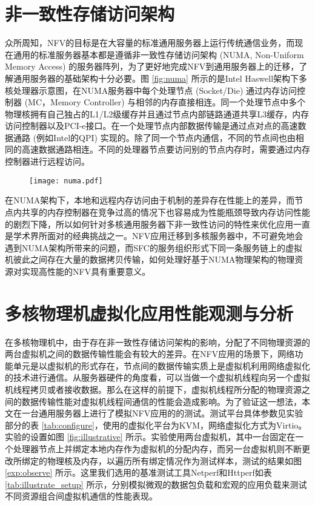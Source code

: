 \section{非一致性存储访问架构}
\label{sec:numa}
众所周知，NFV的目标是在大容量的标准通用服务器上运行传统通信业务，而现在通用的标准服务器基本都是遵循非一致性存储访问架构 (NUMA, Non-Uniform Memory Access) 的服务器阵列，为了更好地完成NFV到通用服务器上的迁移，了解通用服务器的基础架构十分必要。图 \ref{fig:numa} 所示的是Intel Haswell架构下多核处理器示意图，在NUMA服务器中每个处理节点 (Socket/Die) 通过内存访问控制器 (MC，Memory Controller) 与相邻的内存直接相连。同一个处理节点中多个物理核拥有自己独占的L1/L2级缓存并且通过节点内部链路通道共享L3缓存，内存访问控制器以及PCI-e接口。在一个处理节点内部数据传输是通过点对点的高速数据通路 (例如Intel的QPI) 实现的。除了同一个节点内通信，不同的节点间也由相同的高速数据通路相连。不同的处理器节点要访问别的节点内存时，需要通过内存控制器进行远程访问。
\begin{figure}[!htp]
	\centering
	\texttt{[image: numa.pdf]}
\end{figure}
在NUMA架构下，本地和远程内存访问由于机制的差异存在性能上的差异，而节点内共享的内存控制器在竞争过高的情况下也容易成为性能瓶颈导致内存访问性能的剧烈下降，所以如何针对多核通用服务器下非一致性访问的特性来优化应用一直是学术界所面对的经典挑战之一。NFV应用迁移到多核服务器中，不可避免地会遇到NUMA架构所带来的问题，而SFC的服务组织形式下同一条服务链上的虚拟机彼此之间存在大量的数据拷贝传输，如何处理好基于NUMA物理架构的物理资源对实现高性能的NFV具有重要意义。


\section{多核物理机虚拟化应用性能观测与分析}
\label{related:observe}
在多核物理机中，由于存在非一致性存储访问架构的影响，分配了不同物理资源的两台虚拟机之间的数据传输性能会有较大的差异。在NFV应用的场景下，网络功能单元是以虚拟机的形式存在，节点间的数据传输实质上是虚拟机利用网络虚拟化的技术进行通信。从服务器硬件的角度看，可以当做一个虚拟机线程向另一个虚拟机线程拷贝或者接收数据。那么在这样的前提下，虚拟机线程所分配的物理资源之间的数据传输性能对虚拟机线程间通信的性能会造成影响。为了验证这一想法，本文在一台通用服务器上进行了模拟NFV应用的的测试。测试平台具体参数见实验部分的表 \ref{tab:configure}，使用的虚拟化平台为KVM，网络虚拟化方式为Virtio。实验的设置如图 \ref{fig:illustrative} 所示。实验使用两台虚拟机，其中一台固定在一个处理器节点上并绑定本地内存作为虚拟机的分配内存，而另一台虚拟机则不断更改所绑定的物理核及内存，以遍历所有绑定情况作为测试样本，测试的结果如图 \ref{exp:observe} 所示。这里我们选用的基准测试工具Netperf和Httperf如表 \ref{tab:illustrate_setup} 所示，分别模拟微观的数据包负载和宏观的应用负载来测试不同资源组合间虚拟机通信的性能表现。

